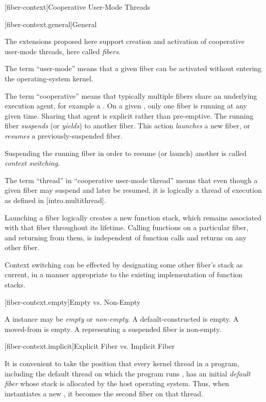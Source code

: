 \newpage

\setcounter{section}{33}
\setcounter{subsection}{6}

\label{api}

[fiber-context]{Cooperative User-Mode Threads}

[fiber-context.general]{General}

The extensions proposed here support creation and activation of cooperative
user-mode threads, here called \emph{fibers}.

The term ``user-mode'' means that a given fiber can be activated without
entering the operating-system kernel.

The term ``cooperative'' means that typically multiple fibers share an
underlying execution agent, for example a . On a
given , only one fiber is running at any given time. Sharing
that agent is explicit rather than pre-emptive. The running
fiber \emph{suspends} (or \emph{yields}) to another fiber. This
action \emph{launches} a new fiber, or \emph{resumes} a previously-suspended
fiber.

Suspending the running fiber in order to resume (or launch) another is
called \emph{context switching}.

The term ``thread'' in ``cooperative user-mode thread'' means that even
though a given fiber may suspend and later be resumed, it is logically a
thread of execution as defined in [intro.multithread].

Launching a fiber logically creates a new function stack, which remains
associated with that fiber throughout its lifetime. Calling functions on a
particular fiber, and returning from them, is independent of function calls
and returns on any other fiber.

Context switching can be effected by designating some other fiber's stack as
current, in a manner appropriate to the existing implementation of function stacks.

[fiber-context.empty]{Empty vs. Non-Empty}

A \fiber instance may be \emph{empty} or \emph{non-empty}. A
default-constructed \fiber is empty. A moved-from \fiber is empty. A \fiber
representing a suspended fiber is non-empty.

[fiber-context.implicit]{Explicit Fiber vs. Implicit Fiber}

It is convenient to take the position that every kernel thread in a program,
including the default thread on which the program runs \main, has an initial
\emph{default fiber} whose stack is allocated by the host operating system. Thus,
when \main instantiates a new \fiber, it becomes the second fiber on
that thread.

